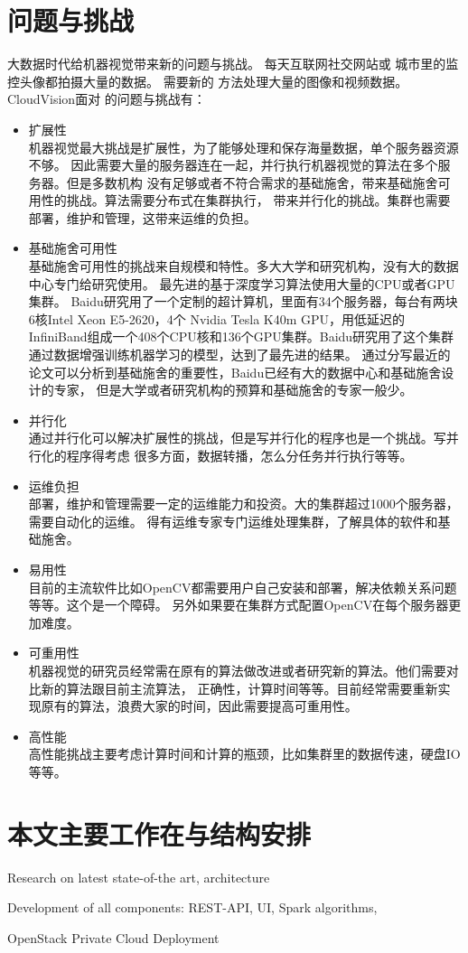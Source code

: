\section{问题与挑战}
\label{sec:challenges}
大数据时代给机器视觉带来新的问题与挑战。
每天互联网社交网站或
城市里的监控头像都拍摄大量的数据。
需要新的 方法处理大量的图像和视频数据。
CloudVision面对 的问题与挑战有：
\begin{itemize}
  \item 扩展性 \\
        机器视觉最大挑战是扩展性，为了能够处理和保存海量数据，单个服务器资源不够。
        因此需要大量的服务器连在一起，并行执行机器视觉的算法在多个服务器。但是多数机构
        没有足够或者不符合需求的基础施舍，带来基础施舍可用性的挑战。算法需要分布式在集群执行，
        带来并行化的挑战。集群也需要部署，维护和管理，这带来运维的负担。
  \item 基础施舍可用性 \\
        基础施舍可用性的挑战来自规模和特性。多大大学和研究机构，没有大的数据中心专门给研究使用。
        最先进的基于深度学习算法使用大量的CPU或者GPU集群\cite{googlenet2015, google2015rethinking, baidup2015deepgpu}。
        Baidu研究用了一个定制的超计算机，里面有34个服务器，每台有两块6核Intel Xeon E5-2620，4个
        Nvidia Tesla K40m GPU，用低延迟的InfiniBand组成一个408个CPU核和136个GPU集群。Baidu研究用了这个集群
        通过数据增强训练机器学习的模型，达到了最先进的结果。\cite{baidup2015deepgpu}
        通过分写最近的论文可以分析到基础施舍的重要性，Baidu已经有大的数据中心和基础施舍设计的专家，
        但是大学或者研究机构的预算和基础施舍的专家一般少。
  \item 并行化 \\
        通过并行化可以解决扩展性的挑战，但是写并行化的程序也是一个挑战。写并行化的程序得考虑
        很多方面，数据转播，怎么分任务并行执行等等。
  \item 运维负担 \\
        部署，维护和管理需要一定的运维能力和投资。大的集群超过1000个服务器，需要自动化的运维。
        得有运维专家专门运维处理集群，了解具体的软件和基础施舍。
  \item 易用性 \\
        目前的主流软件比如OpenCV都需要用户自己安装和部署，解决依赖关系问题等等。这个是一个障碍。
        另外如果要在集群方式配置OpenCV在每个服务器更加难度。
  \item 可重用性 \\
        机器视觉的研究员经常需在原有的算法做改进或者研究新的算法。他们需要对比新的算法跟目前主流算法，
        正确性，计算时间等等。目前经常需要重新实现原有的算法，浪费大家的时间，因此需要提高可重用性。
  \item 高性能 \\
        高性能挑战主要考虑计算时间和计算的瓶颈，比如集群里的数据传速，硬盘IO等等。
\end{itemize}


\section{本文主要工作在与结构安排}
\label{sec:main_work}

Research on latest state-of-the art, architecture

Development of all components: REST-API, UI, Spark algorithms,

OpenStack Private Cloud Deployment


